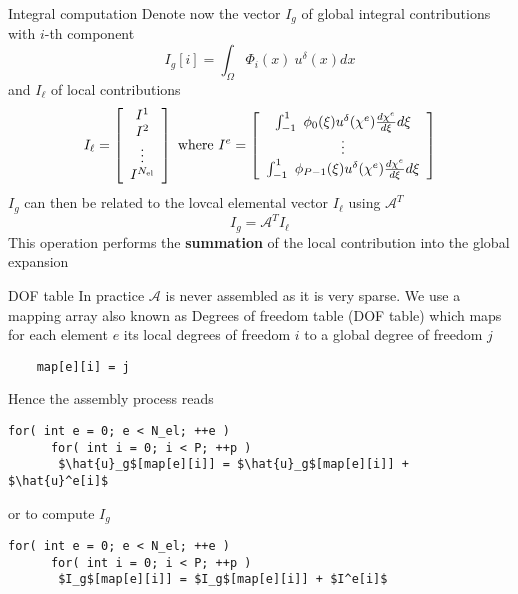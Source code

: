 \begin{frame}{Integral computation}
  Denote now the vector $I_g$ of global integral contributions with $i$-th component
  \begin{equation}
    \label{eq:54}
    I_g[i] = \int_\Omega \Phi_i(x)\ u^\delta(x) dx
  \end{equation}
  and $I_\ell$ of local contributions
  \begin{equation}
    \label{eq:55}
    I_\ell = \left[
      \begin{array}[c]{c}
        I^1\\
        I^2\\
        \vdots\\
        I^{N_\text{el}}
      \end{array}\right]
    \text{ where }
    I^e =  \left[
      \begin{array}[c]{c}
        \int_{-1}^1\ \phi_0(\xi) u^\delta(\chi^e) \frac{d \chi^e}{d \xi} d\xi\\
        \vdots\\
        \int_{-1}^1\ \phi_{P-1}(\xi) u^\delta(\chi^e) \frac{d \chi^e}{d \xi} d\xi
      \end{array}\right]
  \end{equation}
  $I_g$ can then be related to the lovcal elemental vector $I_\ell$ using $\mathcal{A}^T$
  \begin{equation}
    \label{eq:56}
    I_g = \mathcal{A}^T I_\ell
  \end{equation}
  This operation performs the \textbf{summation} of the local contribution into the global expansion
\end{frame}

\begin{frame}[containsverbatim]{DOF table}
  In practice $\mathcal{A}$ is \alert{never assembled} as it is very
  sparse. We use a mapping array also known as Degrees of freedom
  table (DOF table) which maps for each element $e$ its local degrees
  of freedom $i$ to a global degree of freedom $j$
  \begin{lstlisting}
    map[e][i] = j
  \end{lstlisting}

  Hence the assembly process reads
  \begin{lstlisting}[mathescape,texcl]
    for( int e = 0; e < N_el; ++e )
      for( int i = 0; i < P; ++p )
       $\hat{u}_g$[map[e][i]] = $\hat{u}_g$[map[e][i]] + $\hat{u}^e[i]$
  \end{lstlisting}
  or to compute $I_g$
    \begin{lstlisting}[mathescape,texcl]
    for( int e = 0; e < N_el; ++e )
      for( int i = 0; i < P; ++p )
       $I_g$[map[e][i]] = $I_g$[map[e][i]] + $I^e[i]$
  \end{lstlisting}
\end{frame}




